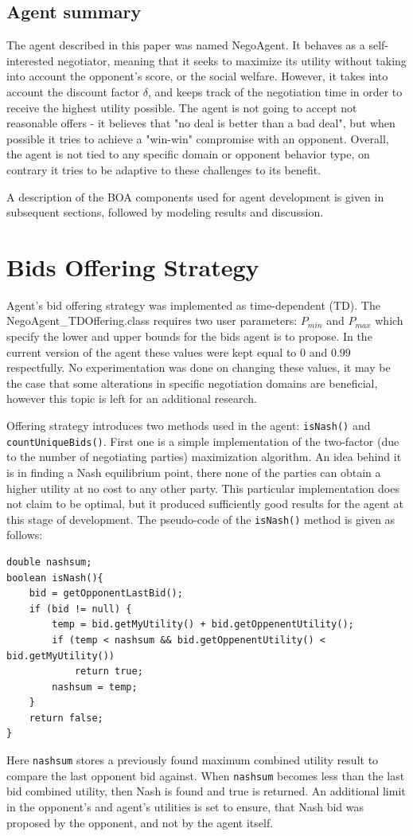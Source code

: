 \documentclass[html]{report}    %
\begin{document}
\subsection{Agent summary}
The agent described in this paper was named NegoAgent. It behaves as a self-interested negotiator, meaning that it seeks to maximize its utility without taking into account the opponent's score, or the social welfare. However, it takes into account the discount factor $\delta$, and keeps track of the negotiation time in order to receive the highest utility possible. The agent is not going to accept not reasonable offers - it believes that "no deal is better than a bad deal", but when possible it tries to achieve a "win-win" compromise with an opponent. Overall, the agent is not tied to any specific domain or opponent behavior type, on contrary it tries to be adaptive to these challenges to its benefit.

A description of the BOA components used for agent development is given in subsequent sections, followed by modeling results and discussion.

\section{Bids Offering Strategy}
Agent's bid offering strategy was implemented as time-dependent (TD). The NegoAgent\_TDOffering.class requires two user parameters: $P_{min}$ and $P_{max}$ which specify the lower and upper bounds for the bids agent is to propose. In the current version of the agent these values were kept equal to $0$ and $0.99$ respectfully. No experimentation was done on changing these values, it may be the case that some alterations in specific negotiation domains are beneficial, however this topic is left for an additional research.

Offering strategy introduces two methods used in the agent: \texttt{isNash()} and \texttt{countUniqueBids()}. First one is a simple implementation of the two-factor (due to the number of negotiating parties) maximization algorithm. An idea behind it is in finding a Nash equilibrium point, there none of the parties can obtain a higher utility at no cost to any other party. This particular implementation does not claim to be optimal, but it produced sufficiently good results for the agent at this stage of development. The pseudo-code of the  \texttt{isNash()} method is given as follows:
\begin{verbatim}
double nashsum;
boolean isNash(){
    bid = getOpponentLastBid();		
    if (bid != null) {
        temp = bid.getMyUtility() + bid.getOppenentUtility();
        if (temp < nashsum && bid.getOppenentUtility() < bid.getMyUtility())
            return true;			
        nashsum = temp;
    }		
    return false;
}
\end{verbatim}
Here \texttt{nashsum} stores a previously found maximum combined utility result to compare the last opponent bid against. When \texttt{nashsum} becomes less than the last bid combined utility, then Nash is found and true is returned. An additional limit in the opponent's and agent's utilities is set to ensure, that Nash bid was proposed by the opponent, and not by the agent itself.
\end{document}
